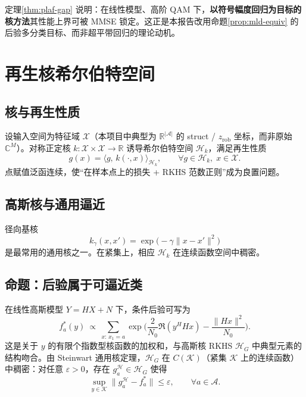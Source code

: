 定理\ref{thm:plaf-gap} 说明：在线性模型、高阶 QAM 下，\textbf{以符号幅度回归为目标的核方法}其性能上界可被 MMSE 锁定。这正是本报告改用命题\ref{prop:mld-equiv} 的后验多分类目标、而非超平带回归的理论动机。

\section{再生核希尔伯特空间}

\subsection{核与再生性质}
设输入空间为特征域 $\mathcal{X}$（本项目中典型为 $\mathbb{R}^{|\mathcal{A}|}$ 的 struct / $z_{\mathrm{rob}}$ 坐标，而非原始 $\mathbb{C}^{M}$）。对称正定核 $k:\mathcal{X}\times\mathcal{X}\to\mathbb{R}$ 诱导希尔伯特空间 $\mathcal{H}_k$，满足再生性质
\begin{equation}
g(x)=\langle g,\,k(\cdot,x)\rangle_{\mathcal{H}_k},\qquad \forall g\in\mathcal{H}_k,\; x\in\mathcal{X}.
\end{equation}
点赋值泛函连续，使“在样本点上的损失 + RKHS 范数正则”成为良置问题\cite{aronszajn1950,schafer2006}。

\subsection{高斯核与通用逼近}
径向基核
\begin{equation}
k_\gamma(x,x')=\exp\big(-\gamma\|x-x'\|^2\big)
\end{equation}
是最常用的通用核之一。在紧集上，相应 $\mathcal{H}_k$ 在连续函数空间中稠密\cite{steinwart2001,steinwart2008}。

\subsection{命题：后验属于可逼近类}
\begin{proposition}
\label{prop:rkhs-approx}
在线性高斯模型 $Y=HX+N$ 下，条件后验可写为
\begin{equation}
f_a^*(y)
\ \propto\
\sum_{x:\,x_1=a}
\exp\Big(
\frac{2}{N_0}\Re(y^H Hx)
-\frac{\|Hx\|^2}{N_0}
\Big).
\label{eq:fstar-exp}
\end{equation}
这是关于 $y$ 的有限个指数型核函数的加权和，与高斯核 RKHS $\mathcal{H}_G$ 中典型元素的结构吻合。由 Steinwart 通用核定理\cite{steinwart2001}，$\mathcal{H}_G$ 在 $C(\mathcal{K})$（紧集 $\mathcal{K}$ 上的连续函数）中稠密：对任意 $\varepsilon>0$，存在 $g_a^{\mathcal{H}}\in\mathcal{H}_G$ 使得
\begin{equation}
\sup_{y\in\mathcal{K}}\|g_a^{\mathcal{H}}-f_a^*\|\le\varepsilon,\qquad\forall a\in\mathcal{A}.
\end{equation}
\end{proposition}

